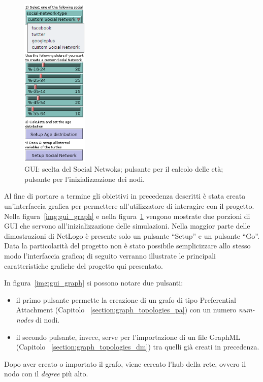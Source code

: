 \begin{figure}
  \vspace*{-35pt}
  \begin{center}
    \includegraphics[width=0.28\textwidth]{img/gui-main.png}
  \end{center}
 \vspace*{-10pt}
 \caption{GUI: 
 scelta del Social Netwoks;
 pulsante per il calcolo delle età;
 pulsante per l'inizializzazione dei nodi.}
 \vspace{-15 mm}
 \label{img:gui_main}
\end{figure}

Al fine di portare a termine gli obiettivi in precedenza descritti è stata creata un'interfaccia grafica 
per permettere all'utilizzatore di interagire con il progetto.
Nella figura~\ref{img:gui_graph} e nella figura~\ref{img:gui_main} vengono mostrate due porzioni di GUI che servono 
all'inizializzazione delle simulazioni.
Nella maggior parte delle dimostrazioni di NetLogo è presente solo un pulsante ``Setup'' 
e un pulsante ``Go''. Data la particolarità del progetto non è stato possibile semplicizzare allo stesso modo 
l'interfaccia grafica; di seguito verranno illustrate le principali caratteristiche grafiche del progetto qui presentato.

In figura~\ref{img:gui_graph} si possono notare due pulsanti:
\begin{itemize}
 \item il primo pulsante permette la creazione di un grafo di tipo Preferential Attachment 
  (Capitolo ~\ref{section:graph_topologies_pa}) con un numero \emph{num-nodes} di nodi.
 \item il secondo pulsante, invece, serve per l'importazione di un file GraphML (Capitolo ~\ref{section:graph_topologies_dm}) tra 
  quelli già creati in precedenza.
\end{itemize}
Dopo aver creato o importato il grafo, viene cercato l'hub della rete, ovvero il nodo con il \emph{degree} più alto.

